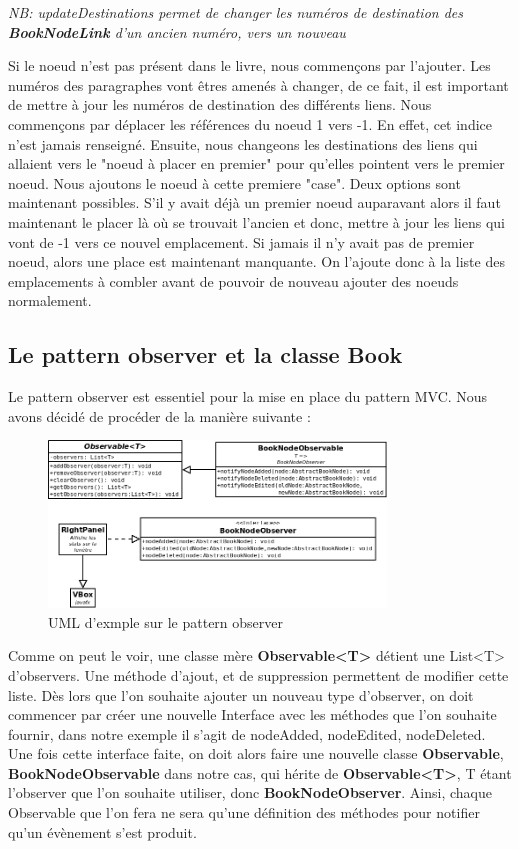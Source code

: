 			\textit{NB: updateDestinations permet de changer les numéros de destination des \textbf{BookNodeLink} d'un ancien numéro, vers un nouveau}

			Si le noeud n'est pas présent dans le livre, nous commençons par l'ajouter. Les numéros des paragraphes vont êtres amenés à changer, de ce fait, il est important de mettre à jour les numéros de destination des différents liens. Nous commençons par déplacer les références du noeud 1 vers -1. En effet, cet indice n'est jamais renseigné. Ensuite, nous changeons les destinations des liens qui allaient vers le "noeud à placer en premier" pour qu'elles pointent vers le premier noeud. Nous ajoutons le noeud à cette premiere "case". Deux options sont maintenant possibles. S'il y avait déjà un premier noeud auparavant alors il faut maintenant le placer là où se trouvait l'ancien et donc, mettre à jour les liens qui vont de -1 vers ce nouvel emplacement. Si jamais il n'y avait pas de premier noeud, alors une place est maintenant manquante. On l'ajoute donc à la liste des emplacements à combler avant de pouvoir de nouveau ajouter des noeuds normalement.

		\subsection{Le pattern observer et la classe Book}
			\label{subsec:pattern_observer}

			Le pattern observer est essentiel pour la mise en place du pattern MVC. Nous avons décidé de procéder de la manière suivante :

			\begin{figure}[H]
				\centering\includegraphics[width=0.8\textwidth, keepaspectratio]{img/observer.png}
				\caption{UML d'exmple sur le pattern observer}
			\end{figure}

			Comme on peut le voir, une classe mère \textbf{Observable<T>} détient une List<T> d'observers. Une méthode d'ajout, et de suppression permettent de modifier cette liste. Dès lors que l'on souhaite ajouter un nouveau type d'observer, on doit commencer par créer une nouvelle Interface avec les méthodes que l'on souhaite fournir, dans notre exemple il s'agit de nodeAdded, nodeEdited, nodeDeleted. Une fois cette interface faite, on doit alors faire une nouvelle classe \textbf{Observable}, \textbf{BookNodeObservable} dans notre cas, qui hérite de \textbf{Observable<T>}, T étant l'observer que l'on souhaite utiliser, donc \textbf{BookNodeObserver}. Ainsi, chaque Observable que l'on fera ne sera qu'une définition des méthodes pour notifier qu'un évènement s'est produit.

